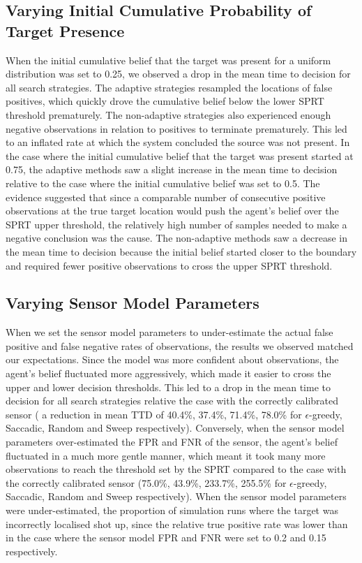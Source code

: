 \subsection{Varying Initial Cumulative Probability of Target Presence}
When the initial cumulative belief that the target was present for a uniform distribution was set to 0.25, we observed a drop in the mean time to decision for all search strategies. The adaptive strategies resampled the locations of false positives, which quickly drove the cumulative belief below the lower SPRT threshold prematurely. The non-adaptive strategies also experienced enough negative observations in relation to positives to terminate prematurely. This led to an inflated rate at which the system concluded the source was not present. In the case where the initial cumulative belief that the target was present started at 0.75, the adaptive methods saw a slight increase in the mean time to decision relative to the case where the initial cumulative belief was set to 0.5. The evidence suggested that since a comparable number of consecutive positive observations at the true target location would push the agent's belief over the SPRT upper threshold, the relatively high number of samples needed to make a negative conclusion was the cause. The non-adaptive methods saw a decrease in the mean time to decision because the initial belief started closer to the boundary and required  fewer positive observations to cross the upper SPRT threshold.\par

\subsection{Varying Sensor Model Parameters}
When we set the sensor model parameters to under-estimate the actual false positive and false negative rates of observations, the results we observed matched our expectations. Since the model was more confident about observations, the agent's belief fluctuated more aggressively, which made it easier to cross the upper and lower decision thresholds. This led to a drop in the mean time to decision for all search strategies relative the case with the correctly calibrated sensor ( a reduction in mean TTD of 40.4\%, 37.4\%, 71.4\%, 78.0\% for $\epsilon$-greedy, Saccadic, Random and Sweep respectively). Conversely, when the sensor model parameters over-estimated the FPR and FNR of the sensor, the agent's belief fluctuated in a much more gentle manner, which meant it took many more observations to reach the threshold set by the SPRT compared to the case with the correctly calibrated sensor (75.0\%, 43.9\%, 233.7\%, 255.5\% for $\epsilon$-greedy, Saccadic, Random and Sweep respectively). When the sensor model parameters were under-estimated, the proportion of simulation runs where the target was incorrectly localised shot up, since the relative true positive rate was lower than in the case where the sensor model FPR and FNR were set to 0.2 and 0.15 respectively.\par

